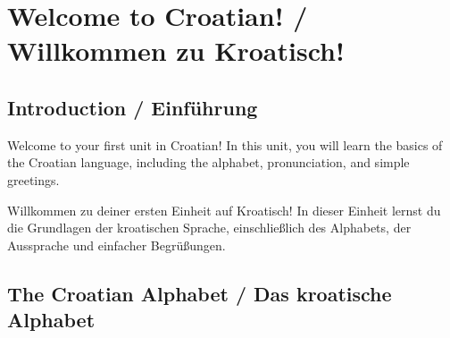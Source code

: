 \chapter{Welcome to Croatian! / Willkommen zu Kroatisch!}

\section{Introduction / Einführung}
Welcome to your first unit in Croatian! In this unit, you will learn the basics of the Croatian language, including the alphabet, pronunciation, and simple greetings.

Willkommen zu deiner ersten Einheit auf Kroatisch! In dieser Einheit lernst du die Grundlagen der kroatischen Sprache, einschließlich des Alphabets, der Aussprache und einfacher Begrüßungen.

\section{The Croatian Alphabet / Das kroatische Alphabet}

